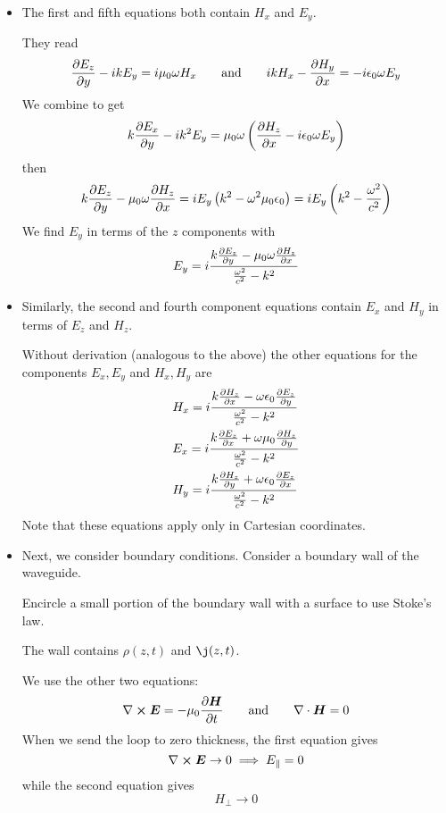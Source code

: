 \documentclass[11pt, a4paper]{article}
\newcommand{\eqtext}[1]{\qquad \text{#1} \qquad}
\renewcommand{\vec}[1]{\bm{#1}} %
\newcommand{\E}{\vec{E}}  %
\renewcommand{\H}{\vec{H}}  %
\newcommand{\ee}{\epsilon_{0}}  %
\newcommand{\mm}{\mu_{0}}  %
\newcommand{\m}{\vec{m}}  %
\renewcommand{\div}{\nabla \cdot}
\renewcommand{\curl}{\nabla \cross}
\begin{document}
\begin{itemize}
	\item The first and fifth equations both contain $ H_{x} $ and $ E_{y} $.
	
	They read
	\begin{equation*}
		\pdv{E_{z}}{y} - ikE_{y} = i \mm \omega H_{x} \eqtext{and} ikH_{x}  - \pdv{H_{y}}{x}   = -i\ee \omega E_{y}
	\end{equation*}
	We combine to get
	\begin{equation*}
		k \pdv{E_{x}}{y} - i k^{2}E_{y}= \mm \omega \left(\pdv{H_{z}}{x} - i \ee \omega E_{y}\right)
	\end{equation*}
	then
	\begin{equation*}
		k \pdv{E_{z}}{y} - \mm \omega \pdv{H_{z}}{x} = iE_{y}\left(k^{2} - \omega^{2}\mm \ee\right) =  iE_{y}\left(k^{2} - \frac{\omega^{2}}{c^{2}}\right) 
	\end{equation*}
	We find $ E_{y} $ in terms of the $ z $ components with
	\begin{equation*}
		E_{y} = i \frac{k \pdv{E_{z}}{y} - \mm \omega \pdv{H_{z}}{x}}{\frac{\omega^{2}}{c^{2}} - k^{2}}
	\end{equation*}
	
	\item Similarly, the second and fourth component equations contain $ E_{x} $ and $ H_{y} $ in terms of $ E_{z} $ and $ H_{z} $. 
	
	Without derivation (analogous to the above) the other equations for the components $ E_{x}, E_{y} $ and $ H_{x}, H_{y} $ are
	\begin{align*}
		&H_{x} = i \frac{k\pdv{H_{z}}{x} - \omega \ee \pdv{E_{z}}{y}}{\frac{\omega^{2}}{c^{2}} - k^{2}}\\
		&E_{x} = i \frac{k \pdv{E_{z}}{x} + \omega \mm \pdv{H_{z}}{y}}{\frac{\omega^{2}}{c^{2}} - k^{2}}\\
		&H_{y} = i \frac{k\pdv{H_{z}}{y} + \omega \ee \pdv{E_{z}}{x}}{\frac{\omega^{2}}{c^{2}} - k^{2}}\\
	\end{align*}
	Note that these equations apply only in Cartesian coordinates.
	
	\item Next, we consider boundary conditions. Consider a boundary wall of the waveguide. 
	
	Encircle a small portion of the boundary wall with a surface to use Stoke's law.
	
	The wall contains $ \rho(z, t) $ and $ \j(z, t) $. 
	
	We use the other two equations:
	\begin{equation*}
		\curl \E = - \mm \pdv{\H}{t} \eqtext{and} \div \H = 0
	\end{equation*}
	When we send the loop to zero thickness, the first equation gives
	\begin{equation*}
		\curl \E \to 0 \implies E_{\parallel} = 0
	\end{equation*}
	while the second equation gives
	\begin{equation*}
		H_{\perp} \to 0
	\end{equation*}
	

\end{itemize}
\end{document}
